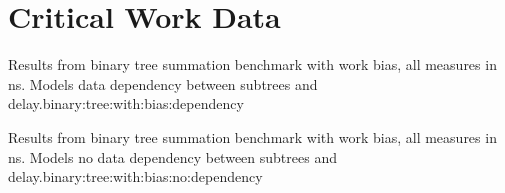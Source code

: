 \section{Critical Work Data} \label{app:crit:work:data}
{Results from binary tree summation benchmark with work bias, all measures in ns. Models data dependency between subtrees and delay.}{binary:tree:with:bias:dependency}

{Results from binary tree summation benchmark with work bias, all measures in ns. Models no data dependency between subtrees and delay.}{binary:tree:with:bias:no:dependency}
